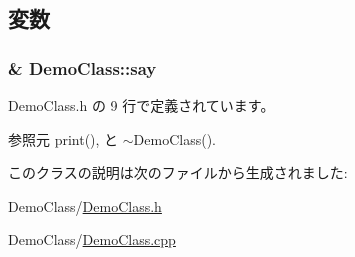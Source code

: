 \subsection{変数}
\hypertarget{classDemoClass_aed27d0c4483b8a29069e2e90efb8ff12}{
\subsubsection[{say}]{\& {\bf \-Demo\-Class\-::say}}}\label{classDemoClass_aed27d0c4483b8a29069e2e90efb8ff12}


 \-Demo\-Class.\-h の 9 行で定義されています。



参照元 print(), と $\sim$\-Demo\-Class().



このクラスの説明は次のファイルから生成されました\-:\begin{DoxyCompactItemize}
\item 
\-Demo\-Class/\hyperlink{DemoClass_8h}{\-Demo\-Class.\-h}\item 
\-Demo\-Class/\hyperlink{DemoClass_8cpp}{\-Demo\-Class.\-cpp}\end{DoxyCompactItemize}
